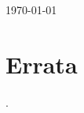 \documentclass[
English,                 %
biblatex,             %
]{kththesis}
\newif\ifinswedish
\begin{document}
\vspace{20pt}
\begin{large}
  \begin{flushleft}
    \FigtreeFont{}\fontsize{11.5}{13}\selectfont
    \expandafter\MakeUppercase\expandafter\@authorsFirstname\space\expandafter\MakeUppercase\expandafter\@authorsLastname \par
    \ifx\@secondAuthorsLastname\@empty\relax
    \else\vspace{1ex}\expandafter\MakeUppercase\expandafter\@secondAuthorsFirstname\space\expandafter\MakeUppercase\expandafter\@secondAuthorsLastname \par
    \fi
  \end{flushleft}
\end{large}
\makeatother
\vspace{20pt}
\begin{large}
\begin{flushleft}
\FigtreeFont{}\fontsize{9}{11}\selectfont 
\today %
\end{flushleft}
\end{large}
\vspace{32pt}
\ifinswedish
\selectlanguage{swedish}
\else
{}
\fi


\glsresetall  %

\chapter*{Errata}
\label{ch:Errata}
\setcounter{page}{1}
\fancyfoot{}
\renewcommand{\headrulewidth}{0pt}

\setlength{\headheight}{14pt}
\addtolength{\topmargin}{-2pt}.

\pagestyle{fancy}
\end{document}
